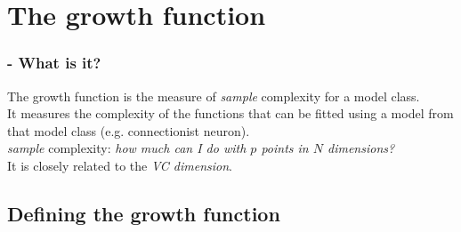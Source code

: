 \section{The growth function}


\begin{frame}\frametitle{\secname - What is it?}

The growth function is the measure of \emph{sample} complexity for a model class.\\[5mm]

It measures the complexity of the functions that can be fitted using a model from that model class (e.g. connectionist neuron).\\[5mm]

\emph{sample} complexity: \emph{how much can I do with $p$ points in $N$ dimensions?}\\[10mm]

It is closely related to the \emph{VC dimension}.

\end{frame}

\subsection{Defining the growth function}

